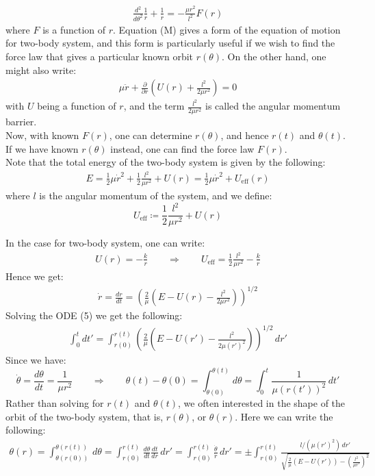 \documentclass[11pt,oneside]{book}
\theoremstyle{break}
\theoremstyle{break}
\begin{document}
\begin{align*}
\frac{d^2}{d\theta^2}\frac{1}{r} + \frac{1}{r} = -\frac{\mu r^2}{l^2} F(r) \tag{M}
\end{align*}
where $F$ is a function of $r$. Equation (M) gives a form of the equation of motion for two-body system, and this form is particularly useful if we wish to find the force law that gives a particular known orbit $r(\theta)$. On the other hand, one might also write:
\begin{align*}
\mu \ddot{r} + \frac{\partial}{\partial r}\left( U(r)+\frac{l^2}{2\mu r^2}\right) = 0
\end{align*}
with $U$ being a function of $r$, and the term $\frac{l^2}{2\mu r^2}$ is called the angular momentum barrier. \\

Now, with known $F(r)$, one can determine $r(\theta)$, and hence $r(t)$ and $\theta(t)$. If we have known $r(\theta)$ instead, one can find the force law $F(r)$. \\

Note that the total energy of the two-body system is given by the following:
\begin{align*}
E = \frac{1}{2}\mu \dot{r}^2 + \frac{1}{2}\frac{l^2}{\mu r^2}+ U(r) = \frac{1}{2}\mu \dot{r}^2 + U_{\text{eff}}(r)
\end{align*}
where $l$ is the angular momentum of the system, and we define:
$$U_{\text{eff}} \coloneqq \frac{1}{2}\frac{l^2}{\mu r^2}+ U(r)$$

In the case for two-body system, one can write:
\begin{align*}
U(r) = -\frac{k}{r} \qquad \Rightarrow \qquad U_{\text{eff}} = \frac{1}{2}\frac{l^2}{\mu r^2}  -\frac{k}{r}
\end{align*}
Hence we get:
\begin{align*}
\dot{r} = \frac{dr}{dt}= \left( \frac{2}{\mu}\left( E - U(r) - \frac{l^2}{2\mu r^2}\right) \right)^{1/2} \tag{5}
\end{align*}
Solving the ODE (5) we get the following:
\begin{align*}
\int_0^{t} dt' = \int_{r(0)}^{r(t)} \left( \frac{2}{\mu}\left( E - U(r') - \frac{l^2}{2\mu (r')^2}\right) \right)^{1/2} \, dr'
\end{align*}
Since we have: 
$$\dot{\theta}=\frac{d\theta}{dt} = \frac{1}{\mu r^2} \qquad \Rightarrow \qquad \theta(t) - \theta(0) = \int_{\theta(0)}^{\theta(t)} d\theta = \int_0^t \frac{1}{\mu (r(t'))^2}\, dt' $$
Rather than solving for $r(t)$ and $\theta(t)$, we often interested in the shape of the orbit of the two-body system, that is, $r(\theta)$, or $\theta(r)$. Here we can write the following:
\begin{align*}
\theta(r) = \int_{\theta(r(0))}^{\theta(r(t))}\, d\theta = \int_{r(0)}^{r(t)} \frac{d\theta}{dt}\frac{dt}{dr}\, dr' = \int_{r(0)}^{r(t)}\frac{\dot{\theta}}{\dot{r}}\, dr' = \pm \int_{r(0)}^{r(t)}\frac{l / (\mu (r')^2 )\, dr'}{\sqrt{ \frac{2}{\mu}\left( E - U(r')\right) - \left(\frac{l^2}{\mu r'}\right)^2 }} \tag{T}
\end{align*}
\end{document}
